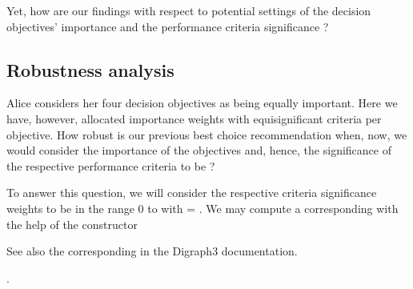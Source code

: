 \documentclass[a4paper,12pt,english]{sphinxhowto}
\begin{document}
Yet, how  are our findings with respect to potential settings of the decision objectives’ importance and the performance criteria significance ?


\subsection{Robustness analysis}
\label{\detokenize{tutorial:robustness-analysis}}
Alice considers her four decision objectives as being  equally important. Here we have, however, allocated  importance weights with  equi\sphinxhyphen{}significant criteria per objective. How robust is our previous best choice recommendation when, now, we would consider the importance of the objectives and, hence, the significance of the respective performance criteria to be  ?

To answer this question, we will consider the respective criteria significance weights  to be  in the range 0 to  with  = . We may compute a corresponding  with the help of the  constructor %
\begin{footnote}[22]\sphinxAtStartFootnote
See also the corresponding  in the Digraph3 documentation.
%
\end{footnote}.
\def\sphinxLiteralBlockLabel{\label{\detokenize{tutorial:aliceconfidentdigraph}}}
\begin{sphinxVerbatim}[commandchars=\\\{\},numbers=left,firstnumber=1,stepnumber=1]
  \PYGZbs{}
  \PYGZbs{}
\end{sphinxVerbatim}
\end{document}
